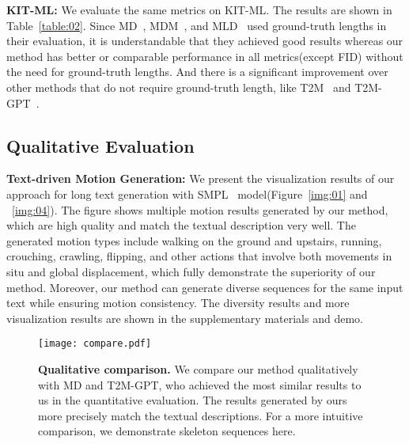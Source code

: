 \documentclass[10pt,twocolumn,letterpaper]{article}
\begin{document}
\textbf{KIT-ML:}
We evaluate the same metrics on KIT-ML. The results are shown in Table~\ref{table:02}. Since MD~\cite{zhang2022motiondiffuse}, MDM~\cite{tevet2023human}, and MLD~\cite{chen2023mld} used ground-truth lengths in their evaluation, it is understandable that they achieved good results whereas our method has better or comparable performance in all metrics(except FID) without the need for ground-truth lengths. And there is a significant improvement over other methods that do not require ground-truth length, like T2M~\cite{guo2022generating} and T2M-GPT~\cite{zhang2023t2m}.

\subsection{Qualitative Evaluation}\label{ssec:sota_quali}
\textbf{Text-driven Motion Generation:}
We present the visualization results of our approach for long text generation with SMPL~\cite{loper2015smpl} model(Figure~\ref{img:01} and ~\ref{img:04}). The figure shows multiple motion results generated by our method, which are high quality and match the textual description very well. The generated motion types include walking on the ground and upstairs, running, crouching, crawling, flipping, and other actions that involve both movements in situ and global displacement, which fully demonstrate the superiority of our method. Moreover, our method can generate diverse sequences for the same input text while ensuring motion consistency. The diversity results and more visualization results are shown in the supplementary materials and demo.
\begin{figure}[t]
    \centering
    \texttt{[image: compare.pdf]}
    \caption{\textbf{Qualitative comparison.} We compare our method qualitatively with MD and T2M-GPT, who achieved the most similar results to us in the quantitative evaluation. The results generated by ours more precisely match the textual descriptions. For a more intuitive comparison, we demonstrate skeleton sequences here.}
    \label{img:05}
\end{figure}
\end{document}
